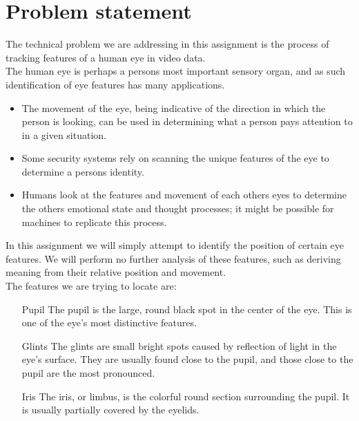 \section{Problem statement}

The technical problem we are addressing in this assignment is the process of tracking features of a human eye in video data.\\
The human eye is perhaps a persons most important sensory organ, and as such identification of eye features has many applications. 
\begin{itemize}
	\item The movement of the eye, being indicative of the direction in which the person is looking, can be used in determining what a person pays attention to in a given situation.
	\item Some security systems rely on scanning the unique features of the eye to determine a persons identity.
	\item Humans look at the features and movement of each others eyes to determine the others emotional state and thought processes; it might be possible for machines to replicate this process.
\end{itemize}

In this assignment we will simply attempt to identify the position of certain eye features. We will perform no further analysis of these features, such as deriving meaning from their relative position and movement.\\

The features we are trying to locate are:
\begin{enumerate}
	\item[Pupil] The pupil is the large, round black spot in the center of the eye. This is one of the eye's most distinctive features.
	\item[Glints] The glints are small bright spots caused by reflection of light in the eye's surface. They are usually found close to the pupil, and those close to the pupil are the most pronounced. 
	\item[Iris] The iris, or limbus, is the colorful round section surrounding the pupil. It is usually partially covered by the eyelids. 
\end{enumerate}


